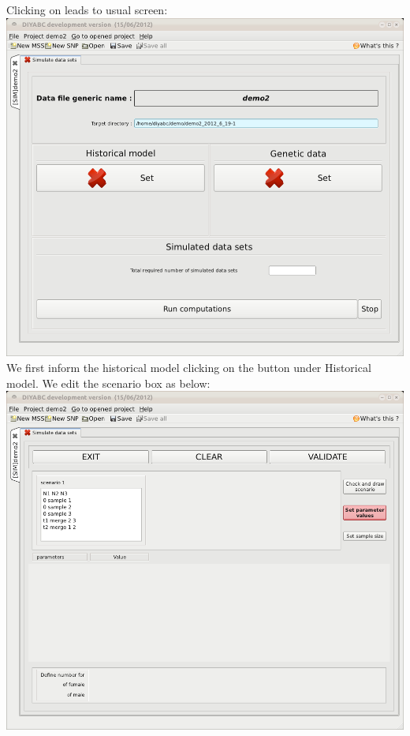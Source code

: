 Clicking on  leads to usual screen:\\

\includegraphics[scale=0.33]{gui_pictures/Capture-DIYABC-65.png} \\

We first inform the historical model clicking on the   button under \textsf{Historical model}. We edit the scenario box as below:\\

\includegraphics[scale=0.33]{gui_pictures/Capture-DIYABC-66.png} \\


